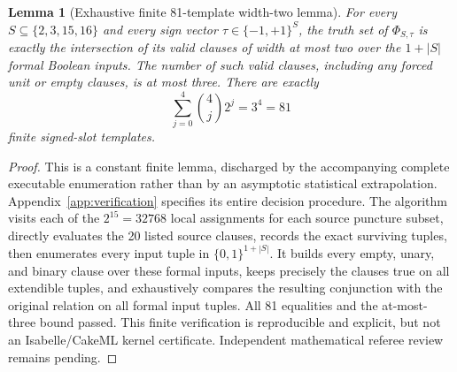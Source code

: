 \documentclass[11pt]{article}
\newtheorem{lemma}{Lemma}
\begin{document}
\begin{lemma}[Exhaustive finite 81-template width-two lemma]\label{lem:81}
For every $S\subseteq\{2,3,15,16\}$ and every sign vector $\tau\in\{-1,+1\}^{S}$, the truth set of $\Phi_{S,\tau}$ is exactly the intersection of its valid clauses of width at most two over the $1+|S|$ \emph{formal} Boolean inputs. The number of such valid clauses, including any forced unit or empty clauses, is at most three. There are exactly
\[
 \sum_{j=0}^4\binom{4}{j}2^j=3^4=81
\]
finite signed-slot templates.
\end{lemma}
\begin{proof}
This is a constant finite lemma, discharged by the accompanying complete executable enumeration rather than by an asymptotic statistical extrapolation. Appendix~\ref{app:verification} specifies its entire decision procedure. The algorithm visits each of the $2^{15}=32768$ local assignments for each source puncture subset, directly evaluates the 20 listed source clauses, records the exact surviving tuples, then enumerates every input tuple in $\{0,1\}^{1+|S|}$. It builds every empty, unary, and binary clause over these formal inputs, keeps precisely the clauses true on all extendible tuples, and exhaustively compares the resulting conjunction with the original relation on all formal input tuples. All 81 equalities and the at-most-three bound passed. This finite verification is reproducible and explicit, but not an Isabelle/CakeML kernel certificate. Independent mathematical referee review remains pending.
\end{proof}
\end{document}
